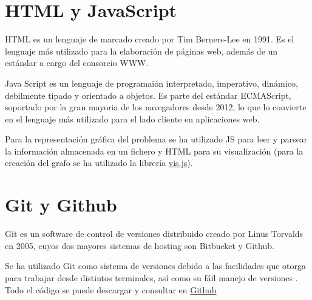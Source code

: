 \section{HTML y JavaScript}
HTML es un lenguaje de marcado  creado por Tim Berners-Lee en 1991. Es el lenguaje más utilizado para la elaboración de páginas web, además de un estándar a cargo del consorcio WWW.

Java Script es un lenguaje de programaión interpretado, imperativo, dinámico, debilmente tipado y  orientado a objetos. Es parte del estándar ECMAScript, soportado por la gran mayoria de los navegadores desde 2012, lo que lo convierte en el lenguaje más utilizado para el lado cliente en aplicaciones web.

Para la representación gráfica del problema se ha utilizado JS para leer y parsear la información almacenada en un fichero y HTML para su visualización (para la creación del grafo se ha utilizado la librería \href{http://visjs.org/docs/network/}{vis.js}).

\section{Git y Github}
Git es un software de control de versiones distribuido creado por Linus Torvalds en 2005, cuyos dos mayores sistemas de hosting son Bitbucket y Github.

Se ha utilizado Git como sistema de versiones debido a las facilidades que otorga para trabajar desde distintos terminales, así como su fáil manejo de versiones . Todo el código se puede descargar y consultar en  \href{https://github.com/cavasanchez/TFG}{Github}



